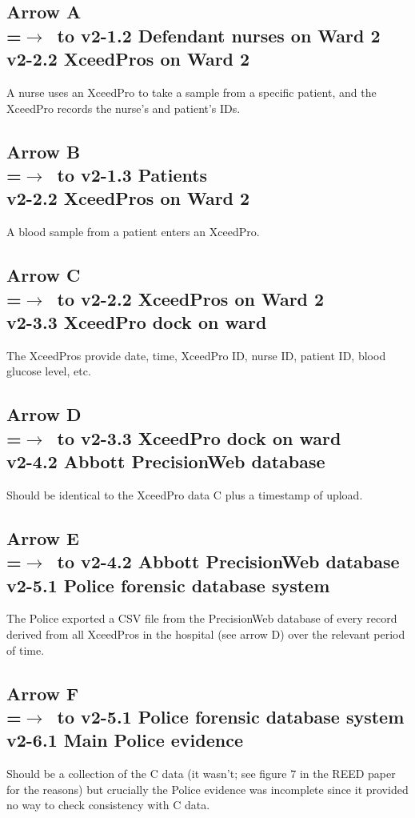 \subsection*{Arrow  A\\
=\hbox{$\rightarrow$~}\hbox to v2-1.2 Defendant nurses on Ward 2\\v2-2.2 XceedPros on Ward 2}
A nurse uses an XceedPro to take a sample from a specific patient, and the XceedPro records the nurse’s and patient's IDs.
\subsection*{Arrow  B\\
=\hbox{$\rightarrow$~}\hbox to v2-1.3 Patients\\v2-2.2 XceedPros on Ward 2}
A blood sample from a patient enters an XceedPro.
\subsection*{Arrow  C\\
=\hbox{$\rightarrow$~}\hbox to v2-2.2 XceedPros on Ward 2\\v2-3.3 XceedPro dock on ward}
The XceedPros provide date, time, XceedPro ID, nurse ID, patient ID, blood glucose level, etc.
\subsection*{Arrow  D\\
=\hbox{$\rightarrow$~}\hbox to v2-3.3 XceedPro dock on ward\\v2-4.2 Abbott PrecisionWeb database}
Should be identical to the XceedPro data C plus a timestamp of upload.
\subsection*{Arrow  E\\
=\hbox{$\rightarrow$~}\hbox to v2-4.2 Abbott PrecisionWeb database\\v2-5.1 Police forensic database system}
The Police exported a CSV file from the PrecisionWeb database of every record derived from all XceedPros in the hospital (see arrow D) over the relevant period of time. 
\subsection*{Arrow   F\\
=\hbox{$\rightarrow$~}\hbox to v2-5.1 Police forensic database system\\v2-6.1 Main Police evidence}
Should be a collection of the C data (it wasn't; see figure 7 in the REED paper for the reasons) but crucially the Police evidence was incomplete since it provided no way to check consistency with C data.

